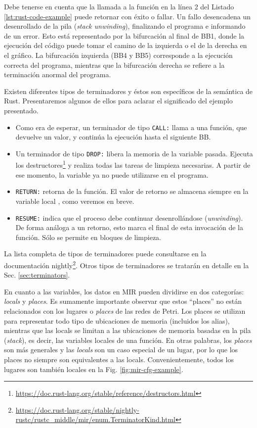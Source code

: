 Debe tenerse en cuenta que la llamada a la función 
en la línea 2 del Listado \ref{lst:rust-code-example} puede retornar con éxito o fallar.
Un fallo desencadena un desenrollado de la pila (\emph{stack unwinding}),
finalizando el programa e informando de un error.
Esto está representado por la bifurcación al final de BB1, donde la
ejecución del código puede tomar el camino de la izquierda o el de la derecha en el gráfico. La
bifurcación izquierda (BB4 y BB5) corresponde a la ejecución correcta del programa, mientras
que la bifurcación derecha se refiere a la terminación anormal del programa.

Existen diferentes tipos de terminadores y éstos son específicos de la semántica de Rust.
Presentaremos algunos de ellos para aclarar el significado del ejemplo presentado.

\begin{itemize}
    \item Como era de esperar, un terminador de tipo \texttt{CALL:} llama a una función, que devuelve un
          valor, y continúa la ejecución hasta el siguiente \acrshort{BB}.
    \item Un terminador de tipo \texttt{DROP:} libera la memoria de la variable pasada. Ejecuta los
          destructores\footnote{\url{https://doc.rust-lang.org/stable/reference/destructors.html}}
          y realiza todas las tareas de limpieza necesarias. A partir de ese momento, la
          variable ya no puede utilizarse en el programa.
    \item \texttt{RETURN:} retorna de la función. El valor de retorno se almacena siempre en la variable local
          , como veremos en breve.
    \item \texttt{RESUME:} indica que el proceso debe continuar desenrollándose (\textit{unwinding}).
          De forma análoga a un retorno, esto marca el final de esta invocación de la función. Sólo se permite en bloques de
          limpieza.
\end{itemize}

La lista completa de tipos de terminadores puede consultarse en la documentación
nightly\footnote{\url{https://doc.rust-lang.org/stable/nightly-rustc/rustc_middle/mir/enum.TerminatorKind.html}}.
Otros tipos de terminadores se tratarán en detalle en la Sec. \ref{sec:terminators}.

En cuanto a las variables, los datos en \acrshort{MIR} pueden dividirse en dos categorías: \emph{locals} y
\emph{places}. Es sumamente importante observar que estos ``places'' no están relacionados con los lugares o \emph{places} de
las redes de Petri.
Los places se utilizan para representar todo tipo de ubicaciones de memoria
(incluidos los alias), mientras que las locals se limitan a las ubicaciones de memoria basadas
en la pila (\emph{stack}), es decir, las variables locales de una función.
En otras palabras, los \emph{places} son más
generales y las \emph{locals} son un caso especial de un lugar,
por lo que los places no siempre son equivalentes a las locals.
Convenientemente, todos los lugares son también locales en la Fig. \ref{fig:mir-cfg-example}.


